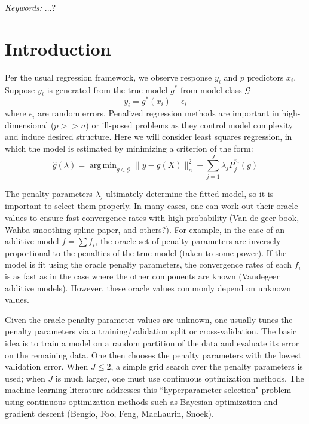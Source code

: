 \documentclass[12pt]{article}
\DeclareMathOperator*{\argmin}{arg\,min}
\begin{document}
\noindent%
{\it Keywords:}  ...?
\vfill

\newpage
{} %
\section{Introduction}

Per the usual regression framework, we observe response $y_i$ and $p$ predictors $x_i$. Suppose $y_i$ is generated from the true model $g^*$ from model class $\mathcal{G}$
\begin{equation}
y_i = g^*(x_i) + \epsilon_i
\end{equation}
where $\epsilon_i$ are random errors. Penalized regression methods are important in high-dimensional ($p >> n$) or ill-posed problems as they control model complexity and induce desired structure. Here we will consider least squares regression, in which the model is estimated by minimizing a criterion of the form:
\begin{equation}
\label{orig_train_criterion}
\hat{g}(\lambda) = \argmin_{g\in \mathcal{G}} \| y -  g(X) \|^2_n + \sum_{j=1}^J \lambda_j P^{v_j}_j(g)
\end{equation}

The penalty parameters $\lambda_j$ ultimately determine the fitted model, so it is important to select them properly. In many cases, one can work out their oracle values to ensure fast convergence rates with high probability (Van de geer-book, Wahba-smoothing spline paper, and others?). For example, in the case of an additive model $f = \sum f_i$, the oracle set of penalty parameters are inversely proportional to the penalties of the true model (taken to some power). If the model is fit using the oracle penalty parameters, the convergence rates of each $f_i$ is as fast as in the case where the other components are known (Vandegeer additive models). However, these oracle values commonly depend on unknown values.

Given the oracle penalty parameter values are unknown, one usually tunes the penalty parameters via a training/validation split or cross-validation. The basic idea is to train a model on a random partition of the data and evaluate its error on the remaining data. One then chooses the penalty parameters with the lowest validation error. When $J \le 2$, a simple grid search over the penalty parameters is used; when $J$ is much larger, one must use continuous optimization methods. The machine learning literature addresses this ``hyperparameter selection" problem using continuous optimization methods such as Bayesian optimization and gradient descent (Bengio, Foo, Feng, MacLaurin, Snoek).
\end{document}
